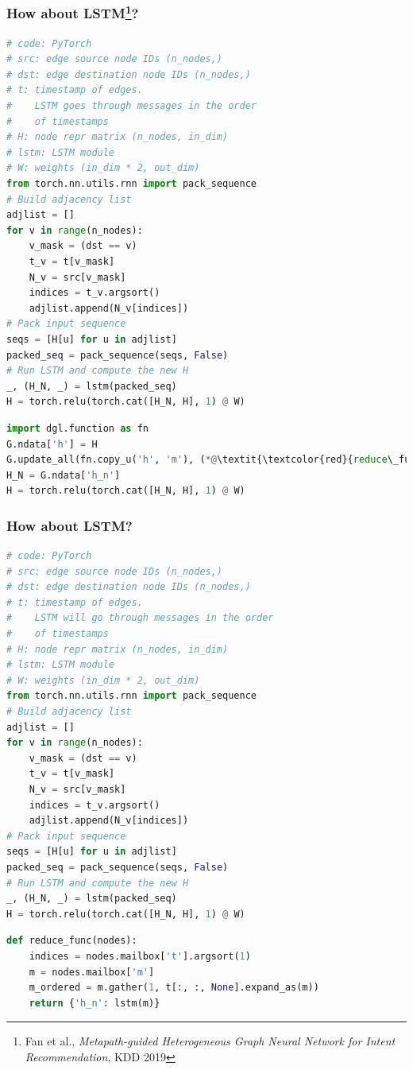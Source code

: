 \documentclass[10pt,aspectratio=169]{beamer}
\begin{document}
	\begin{frame}[fragile]
		\frametitle{How about LSTM\footnote{Fan et al., \emph{Metapath-guided Heterogeneous Graph Neural Network for Intent Recommendation}, KDD 2019}?}
		\begin{minipage}{0.5\textwidth}
\begin{lstlisting}[language=Python]
# code: PyTorch
# src: edge source node IDs (n_nodes,)
# dst: edge destination node IDs (n_nodes,)
# t: timestamp of edges.
#    LSTM goes through messages in the order
#    of timestamps
# H: node repr matrix (n_nodes, in_dim)
# lstm: LSTM module
# W: weights (in_dim * 2, out_dim)
from torch.nn.utils.rnn import pack_sequence
# Build adjacency list
adjlist = []
for v in range(n_nodes): 
    v_mask = (dst == v) 
    t_v = t[v_mask] 
    N_v = src[v_mask] 
    indices = t_v.argsort() 
    adjlist.append(N_v[indices])
# Pack input sequence
seqs = [H[u] for u in adjlist]
packed_seq = pack_sequence(seqs, False)
# Run LSTM and compute the new H
_, (H_N, _) = lstm(packed_seq)
H = torch.relu(torch.cat([H_N, H], 1) @ W)
\end{lstlisting}
		\end{minipage}%
		\begin{minipage}{0.5\textwidth}
\begin{lstlisting}[language=Python]
import dgl.function as fn
G.ndata['h'] = H
G.update_all(fn.copy_u('h', 'm'), (*@\textit{\textcolor{red}{reduce\_func}}@*))
H_N = G.ndata['h_n']
H = torch.relu(torch.cat([H_N, H], 1) @ W)
\end{lstlisting}
		\end{minipage}
	\end{frame}

	\begin{frame}[fragile]
		\frametitle{How about LSTM?}
		\begin{minipage}{0.5\textwidth}
\begin{lstlisting}[language=Python]
# code: PyTorch
# src: edge source node IDs (n_nodes,)
# dst: edge destination node IDs (n_nodes,)
# t: timestamp of edges.
#    LSTM will go through messages in the order
#    of timestamps
# H: node repr matrix (n_nodes, in_dim)
# lstm: LSTM module
# W: weights (in_dim * 2, out_dim)
from torch.nn.utils.rnn import pack_sequence
# Build adjacency list
adjlist = []
for v in range(n_nodes):
    v_mask = (dst == v)
    t_v = t[v_mask]
    N_v = src[v_mask]
    indices = t_v.argsort()
    adjlist.append(N_v[indices])
# Pack input sequence
seqs = [H[u] for u in adjlist]
packed_seq = pack_sequence(seqs, False)
# Run LSTM and compute the new H
_, (H_N, _) = lstm(packed_seq)
H = torch.relu(torch.cat([H_N, H], 1) @ W)
\end{lstlisting}
		\end{minipage}%
		\begin{minipage}{0.5\textwidth}
\begin{lstlisting}[language=Python]
def reduce_func(nodes):
    indices = nodes.mailbox['t'].argsort(1)
    m = nodes.mailbox['m']
    m_ordered = m.gather(1, t[:, :, None].expand_as(m))
    return {'h_n': lstm(m)}
\end{lstlisting}
		\end{minipage}
	\end{frame}
\end{document}
